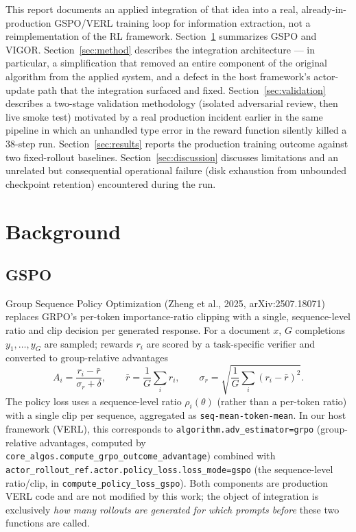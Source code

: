 \documentclass[11pt]{article}
\begin{document}
This report documents an applied integration of that idea into a real,
already-in-production GSPO/VERL training loop for information extraction, not a
reimplementation of the RL framework. Section~\ref{sec:background} summarizes GSPO
and VIGOR. Section~\ref{sec:method} describes the integration architecture — in
particular, a simplification that removed an entire component of the original
algorithm from the applied system, and a defect in the host framework's actor-update
path that the integration surfaced and fixed. Section~\ref{sec:validation} describes
a two-stage validation methodology (isolated adversarial review, then live smoke
test) motivated by a real production incident earlier in the same pipeline in which
an unhandled type error in the reward function silently killed a 38-step run.
Section~\ref{sec:results} reports the production training outcome against two
fixed-rollout baselines. Section~\ref{sec:discussion} discusses limitations and an
unrelated but consequential operational failure (disk exhaustion from
unbounded checkpoint retention) encountered during the run.

\section{Background}
\label{sec:background}

\subsection{GSPO}

Group Sequence Policy Optimization (Zheng et al., 2025, arXiv:2507.18071) replaces
GRPO's per-token importance-ratio clipping with a single, sequence-level ratio and
clip decision per generated response. For a document $x$, $G$ completions
$y_1,\dots,y_G$ are sampled; rewards $r_i$ are scored by a task-specific verifier and
converted to group-relative advantages
\begin{equation}
A_i = \frac{r_i - \bar{r}}{\sigma_r + \delta}, \qquad
\bar{r} = \frac1G\sum_i r_i, \qquad
\sigma_r = \sqrt{\frac1G\sum_i (r_i-\bar r)^2}.
\end{equation}
The policy loss uses a sequence-level ratio $\rho_i(\theta)$ (rather than a per-token
ratio) with a single clip per sequence, aggregated as \texttt{seq-mean-token-mean}.
In our host framework (VERL), this corresponds to
\texttt{algorithm.adv\_estimator=grpo} (group-relative advantages, computed by
\texttt{core\_algos.compute\_grpo\_outcome\_advantage}) combined with
\texttt{actor\_rollout\_ref.actor.policy\_loss.loss\_mode=gspo} (the sequence-level
ratio/clip, in \texttt{compute\_policy\_loss\_gspo}). Both components are
production VERL code and are not modified by this work; the object of integration
is exclusively \emph{how many rollouts are generated for which prompts before}
these two functions are called.
\end{document}
